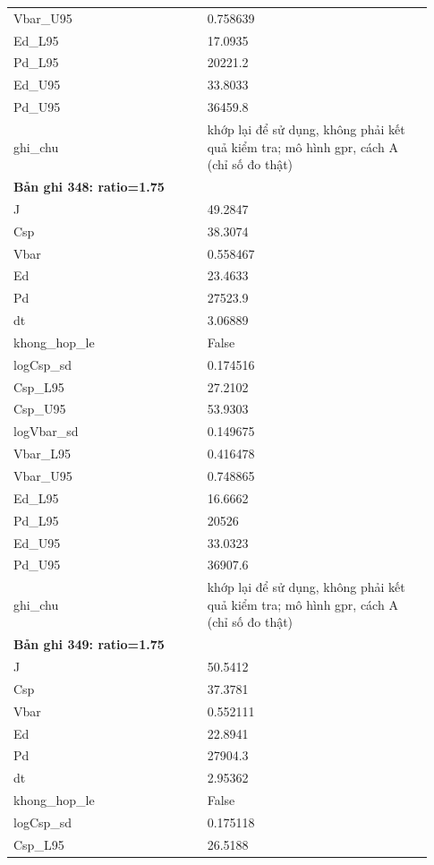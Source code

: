 \begin{longtable}{p{0.43\linewidth}p{0.50\linewidth}}
Vbar\_\allowbreak U95 & 0.758639 \\
Ed\_\allowbreak L95 & 17.0935 \\
Pd\_\allowbreak L95 & 20221.2 \\
Ed\_\allowbreak U95 & 33.8033 \\
Pd\_\allowbreak U95 & 36459.8 \\
ghi\_\allowbreak chu & khớp lại để sử dụng, không phải kết quả kiểm tra; mô hình gpr, cách A (chỉ số đo thật) \\
\midrule
\multicolumn{2}{p{0.95\linewidth}}{\textbf{Bản ghi 348: ratio=1.75}} \\
J & 49.2847 \\
Csp & 38.3074 \\
Vbar & 0.558467 \\
Ed & 23.4633 \\
Pd & 27523.9 \\
dt & 3.06889 \\
khong\_\allowbreak hop\_\allowbreak le & False \\
logCsp\_\allowbreak sd & 0.174516 \\
Csp\_\allowbreak L95 & 27.2102 \\
Csp\_\allowbreak U95 & 53.9303 \\
logVbar\_\allowbreak sd & 0.149675 \\
Vbar\_\allowbreak L95 & 0.416478 \\
Vbar\_\allowbreak U95 & 0.748865 \\
Ed\_\allowbreak L95 & 16.6662 \\
Pd\_\allowbreak L95 & 20526 \\
Ed\_\allowbreak U95 & 33.0323 \\
Pd\_\allowbreak U95 & 36907.6 \\
ghi\_\allowbreak chu & khớp lại để sử dụng, không phải kết quả kiểm tra; mô hình gpr, cách A (chỉ số đo thật) \\
\midrule
\multicolumn{2}{p{0.95\linewidth}}{\textbf{Bản ghi 349: ratio=1.75}} \\
J & 50.5412 \\
Csp & 37.3781 \\
Vbar & 0.552111 \\
Ed & 22.8941 \\
Pd & 27904.3 \\
dt & 2.95362 \\
khong\_\allowbreak hop\_\allowbreak le & False \\
logCsp\_\allowbreak sd & 0.175118 \\
Csp\_\allowbreak L95 & 26.5188 \\

\end{longtable}
